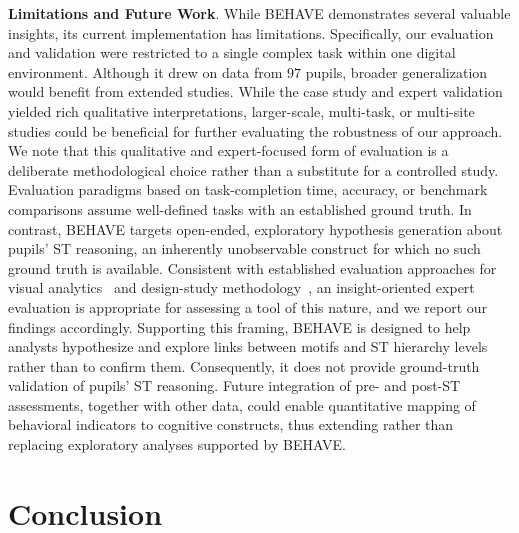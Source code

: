 \documentclass[letterpaper,journal]{IEEEtran}
\begin{document}
\noindent
\textbf{Limitations and Future Work}.
While \textsc{BEHAVE} demonstrates several valuable insights, its current implementation has limitations.
Specifically, our evaluation and validation were restricted to a single complex task within one digital environment. Although it drew on data from $97$ pupils, broader generalization would benefit from extended studies.
While the case study and expert validation yielded rich qualitative interpretations, larger-scale, multi-task, or multi-site studies could be beneficial for further evaluating the robustness of our approach.
We note that this qualitative and expert-focused form of evaluation is a deliberate methodological choice rather than a substitute for a controlled study.
Evaluation paradigms based on task-completion time, accuracy, or benchmark comparisons assume well-defined tasks with an established ground truth. In contrast, \textsc{BEHAVE} targets open-ended, exploratory hypothesis generation about pupils' ST reasoning, an inherently unobservable construct for which no such ground truth is available.
Consistent with established evaluation approaches for visual analytics~\cite{lam2012empirical, carpendale2008evaluating} and design-study methodology~\cite{sedlmair2012design}, an insight-oriented expert evaluation is appropriate for assessing a tool of this nature, and we report our findings accordingly.
Supporting this framing, \textsc{BEHAVE} is designed to help analysts hypothesize and explore links between motifs and ST hierarchy levels rather than to confirm them. Consequently, it does not provide ground-truth validation of pupils' ST reasoning.
Future integration of pre- and post-ST assessments, together with other data, could enable quantitative mapping of behavioral indicators to cognitive constructs, thus extending rather than replacing exploratory analyses supported by \textsc{BEHAVE}.





\section{Conclusion}
\end{document}
